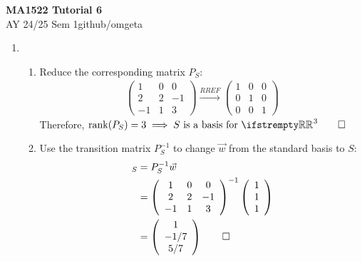 \documentclass[12pt, a4paper]{article}
\newcommand{\mytitle}{MA1522 Tutorial 6}
\newcommand{\myauthor}{github/omgeta}
\newcommand{\mydate}{AY 24/25 Sem 1}
\begin{document}
\raggedright
\footnotesize
\begin{center}
{\normalsize{\textbf{\mytitle}}} \\
{\footnotesize{\mydate\hspace{2pt}\textemdash\hspace{2pt}\myauthor}}
\end{center}

\begin{enumerate}[Q\arabic*.]
  \item 
    \begin{enumerate}[(\alph*)]
      \item Reduce the corresponding matrix $P_S$:
        \begin{align*}
          \left(\begin{array}{ccc} 1 & 0 & 0\\ 2 & 2 & -1\\ -1 & 1 & 3 \end{array}\right)
          \xrightarrow{RREF}
          \left(\begin{array}{ccc} 1 & 0 & 0\\ 0 & 1 & 0\\ 0 & 0 & 1 \end{array}\right)
        \end{align*}
      Therefore, $\rank(P_S)=3\implies S \text{ is a basis for } \RR^3 \qed$

      \item Use the transition matrix $P_S^{-1}$ to change $\vec{w}$ from the standard basis to $S$:
        \begin{align*}
          [\vec{w}]_S &= P_S^{-1}\vec{w}\\
                      &= \left(\begin{array}{ccc} 1 & 0 & 0\\ 2 & 2 & -1\\ -1 & 1 & 3 \end{array}\right)^{-1}\left(\begin{array}{c} 1\\ 1\\ 1 \end{array}\right)\\
                      &= \left(\begin{array}{c} 1\\ -1 /7\\ 5 /7 \end{array}\right) \qed
        \end{align*}


\end{enumerate}
\end{enumerate}
\end{document}
